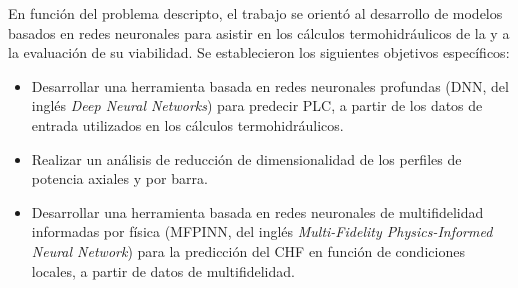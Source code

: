 En función del problema descripto, el trabajo se orientó al desarrollo de modelos basados en redes neuronales para asistir en los cálculos termohidráulicos de la \cna{} y a la evaluación de su viabilidad. Se establecieron los siguientes objetivos específicos:
\begin{itemize}
    \item Desarrollar una herramienta basada en redes neuronales profundas (DNN, del inglés \textit{Deep Neural Networks}) para predecir PLC, a partir de los datos de entrada utilizados en los cálculos termohidráulicos.
    \item Realizar un análisis de reducción de dimensionalidad de los perfiles de potencia axiales y por barra.
    \item Desarrollar una herramienta basada en redes neuronales de multifidelidad informadas por física (MFPINN, del inglés \textit{Multi-Fidelity Physics-Informed Neural Network}) para la predicción del CHF en función de condiciones locales, a partir de datos de multifidelidad.
\end{itemize}